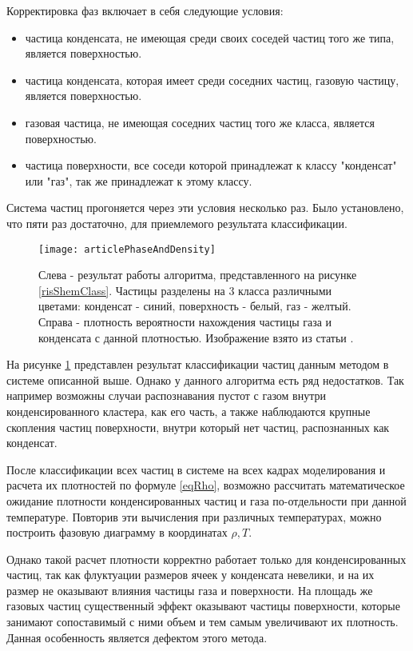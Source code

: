 Корректировка фаз включает в себя следующие условия:
\begin{itemize}
\item частица конденсата, не имеющая среди своих соседей частиц того же типа, является поверхностью.
\item частица конденсата, которая имеет среди соседних частиц, газовую частицу, является поверхностью.
\item газовая частица, не имеющая соседних частиц того же класса,  является поверхностью.
\item частица поверхности, все соседи которой принадлежат к классу "конденсат" или "газ", так же принадлежат к этому классу.
\end{itemize}
Система частиц прогоняется через эти условия несколько раз. Было установлено, что пяти раз достаточно, для приемлемого результата классификации.

\begin{figure}[h]
\begin{center}
\texttt{[image: articlePhaseAndDensity]}
\caption{Слева - результат работы алгоритма, представленного на рисунке \ref{risShemClass}. Частицы разделены на 3 класса различными цветами: конденсат - синий, поверхность - белый, газ - желтый. Справа - плотность вероятности нахождения частицы газа и конденсата с данной плотностью. Изображение взято из статьи \cite{Ovcharov2017}.}
\label{risClassification}
\end{center}
\end{figure}

На рисунке \ref{risClassification} представлен результат классификации частиц данным методом в системе описанной выше.
Однако у данного алгоритма есть ряд недостатков. Так например возможны случаи распознавания пустот с газом внутри конденсированного кластера, как его часть, а также наблюдаются крупные скопления частиц поверхности, внутри который нет частиц, распознанных как конденсат.

После классификации всех частиц в системе на всех кадрах моделирования и расчета их плотностей по формуле \ref{eqRho}, возможно рассчитать математическое ожидание плотности конденсированных частиц и газа по-отдельности при данной температуре.
Повторив эти вычисления при различных температурах, можно построить фазовую диаграмму в координатах $\rho, T$.

Однако такой расчет плотности корректно работает только для конденсированных частиц, так как флуктуации размеров ячеек у конденсата невелики, и на их размер не оказывают влияния частицы газа и поверхности. На площадь же газовых частиц существенный эффект оказывают частицы поверхности, которые занимают сопоставимый с ними объем и тем самым увеличивают их плотность. Данная особенность является дефектом этого метода.

